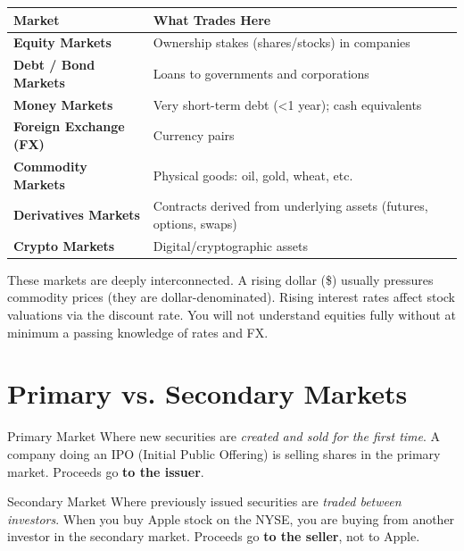 \begin{center}
\begin{tabular}{>{\bfseries}p{4cm} p{9cm}}
\toprule
Market & What Trades Here \\
\midrule
Equity Markets & Ownership stakes (shares/stocks) in companies \\
Debt / Bond Markets & Loans to governments and corporations \\
Money Markets & Very short-term debt (\textless 1 year); cash equivalents \\
Foreign Exchange (FX) & Currency pairs \\
Commodity Markets & Physical goods: oil, gold, wheat, etc. \\
Derivatives Markets & Contracts derived from underlying assets (futures, options, swaps) \\
Crypto Markets & Digital/cryptographic assets \\
\bottomrule
\end{tabular}
\end{center}

\begin{notebox}
These markets are deeply interconnected. A rising dollar (\$) usually pressures commodity prices
(they are dollar-denominated). Rising interest rates affect stock valuations via the discount rate.
You will not understand equities fully without at minimum a passing knowledge of rates and FX.
\end{notebox}

\section{Primary vs. Secondary Markets}

\begin{keyterm}{Primary Market}
Where new securities are \emph{created and sold for the first time}.
A company doing an IPO (Initial Public Offering) is selling shares in the primary market.
Proceeds go \textbf{to the issuer}.
\end{keyterm}

\begin{keyterm}{Secondary Market}
Where previously issued securities are \emph{traded between investors}.
When you buy Apple stock on the NYSE, you are buying from another investor in the secondary market.
Proceeds go \textbf{to the seller}, not to Apple.
\end{keyterm}

